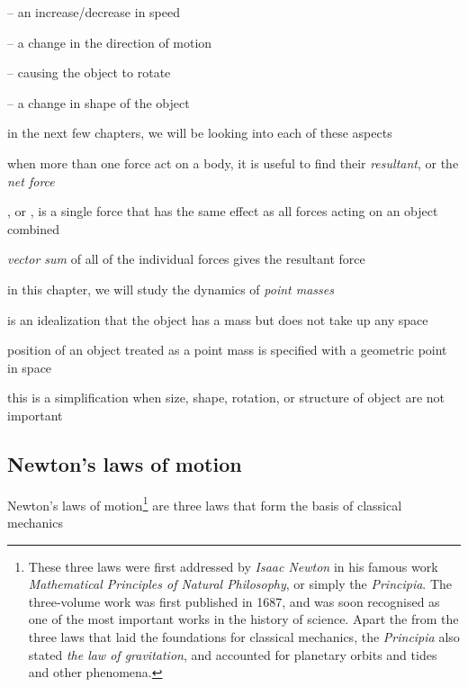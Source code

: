 \begin{compactitem}
	\item[--] an increase/decrease in speed
	
	\item[--] a change in the direction of motion
	
	\item[--] causing the object to rotate
	
	\item[--] a change in shape of the object
\end{compactitem}

in the next few chapters, we will be looking into each of these aspects

\cmt when more than one force act on a body, it is useful to find their \emph{resultant}, or the \emph{net force}

\begin{ilight}
	, or , is a single force that has the same effect as all forces acting on an object combined
\end{ilight}

\emph{vector sum} of all of the individual forces gives the resultant force

\cmt in this chapter, we will study the dynamics of \emph{point masses}

 is an idealization that the object has a mass but does not take up any space

position of an object treated as a point mass is specified with a geometric point in space

this is a simplification when size, shape, rotation, or structure of object are not important




\subsection{Newton's laws of motion}

Newton's laws of motion\footnote{These three laws were first addressed by \emph{Isaac Newton} in his famous work \emph{Mathematical Principles of Natural Philosophy}, or simply the \emph{Principia}. The three-volume work was first published in 1687, and was soon recognised as one of the most important works in the history of science. Apart the from the three laws that laid the foundations for classical mechanics, the \emph{Principia} also stated \emph{the law of gravitation}, and accounted for planetary orbits and tides and other phenomena.} are three laws that form the basis of classical mechanics

